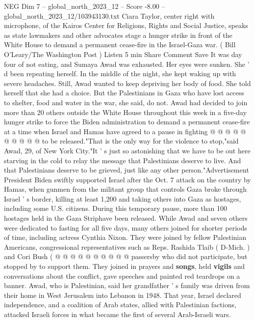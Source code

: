 \begin{textsample}{NEG Dim 7 – global\_north\_2023\_12 – Score -8.00 – global\_north\_2023\_12/103943130.txt}  \label{ex:f7_neg_149}
Ciara Taylor, center right with microphone, of the Kairos Center for Religions, Rights and Social Justice, speaks as state lawmakers and other advocates stage a hunger strike in front of the White House to demand a permanent cease-fire in the Israel-Gaza war. ( Bill O'Leary/The Washington Post ) Listen 5 min Share Comment Save It was day four of not eating, and Sumaya Awad was exhausted.
Her eyes were sunken.
She ' d been repeating herself.
In the middle of the night, she kept waking up with severe headaches.
Still, Awad wanted to keep depriving her body of food.
She told herself that she had a choice.
But the Palestinians in Gaza who have lost access to shelter, food and water in the war, she said, do not.
Awad had decided to join more than 20 others outside the White House throughout this week in a five-day hunger strike to force the Biden administration to demand a permanent cease-fire at a time when Israel and Hamas have agreed to a pause in fighting @ @ @ @ @ @ @ @ @ @ to be released."That is the only way for the violence to stop,"said Awad, 29, of New York City."It ' s just so astonishing that we have to be out here starving in the cold to relay the message that Palestinians deserve to live.
And that Palestinians deserve to be grieved, just like any other person."Advertisement President Biden swiftly supported Israel after the Oct. 7 attack on the country by Hamas, when gunmen from the militant group that controls Gaza broke through Israel ' s border, killing at least 1,200 and taking others into Gaza as hostages, including some U.S. citizens.
During this temporary pause, more than 100 hostages held in the Gaza Striphave been released.
While Awad and seven others were dedicated to fasting for all five days, many others joined for shorter periods of time, including actress Cynthia Nixon.
They were joined by fellow Palestinian Americans, congressional representatives such as Reps.
Rashida Tlaib ( D-Mich. ) and Cori Bush ( @ @ @ @ @ @ @ @ @ @ passersby who did not participate, but stopped by to support them.
They joined in prayers and \textbf{songs}, held \textbf{vigils} and conversations about the conflict, gave speeches and painted red teardrops on a banner.
Awad, who is Palestinian, said her grandfather ' s family was driven from their home in West Jerusalem into Lebanon in 1948.
That year, Israel declared independence, and a coalition of Arab states, allied with Palestinian factions, attacked Israeli forces in what became the first of several Arab-Israeli wars.

\end{textsample}

